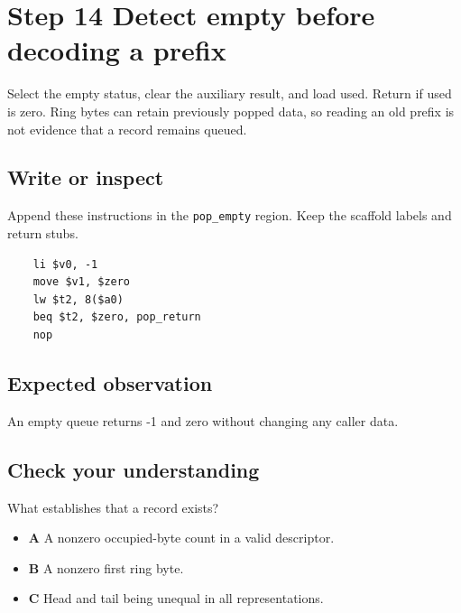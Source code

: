 \section{Step 14 Detect empty before decoding a prefix}\label{ring-s14}

Select the empty status, clear the auxiliary result, and load used. Return if used is zero. Ring bytes can retain previously popped data, so reading an old prefix is not evidence that a record remains queued.

\subsection{Write or inspect}
Append these instructions in the \texttt{pop\_empty} region. Keep the scaffold labels and return stubs.

\begin{verbatim}
    li $v0, -1
    move $v1, $zero
    lw $t2, 8($a0)
    beq $t2, $zero, pop_return
    nop
\end{verbatim}

\subsection{Expected observation}
An empty queue returns -1 and zero without changing any caller data.

\subsection{Check your understanding}
What establishes that a record exists?

\begin{itemize}
  \item \textbf{A} A nonzero occupied-byte count in a valid descriptor.
  \item \textbf{B} A nonzero first ring byte.
  \item \textbf{C} Head and tail being unequal in all representations.
\end{itemize}
